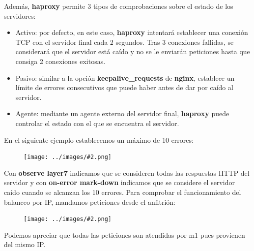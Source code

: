 \documentclass[twoside]{article}
\newcommand{\image}[2]{
\begin{figure}[H]
    \texttt{[image: ../images/\#2.png]}
    \centering
\end{figure}
}
\begin{document}
Además, \textbf{haproxy} permite 3 tipos de comprobaciones sobre el estado de los servidores:
\begin{itemize}
    \item Activo: por defecto, en este caso, \textbf{haproxy} intentará establecer una conexión TCP con el servidor final cada 2 segundos. Tras 3 conexiones fallidas, se considerará que el servidor está caído y no se le enviarán peticiones hasta que consiga 2 conexiones exitosas.
    \item Pasivo: similar a la opción \textbf{keepalive\_requests} de \textbf{nginx}, establece un límite de errores consecutivos que puede haber antes de dar por caído al servidor.
    \item Agente: mediante un agente externo del servidor final, \textbf{haproxy} puede controlar el estado con el que se encuentra el servidor.
\end{itemize}
En el siguiente ejemplo establecemos un máximo de 10 errores:
\image{8}{21}
Con \textbf{observe layer7} indicamos que se consideren todas las respuestas HTTP del servidor y con \textbf{on-error mark-down} indicamos que se considere el servidor caído cuando se alcanzan los 10 errores.
Para comprobar el funcionamiento del balanceo por IP, mandamos peticiones desde el anfitrión:
\image{6}{22}
Podemos apreciar que todas las peticiones son atendidas por m1 pues provienen del mismo IP.
\end{document}
